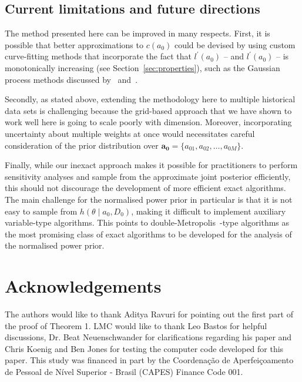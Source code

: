 \documentclass[a4paper, notitlepage, 11pt]{article}
\begin{document}
\subsection{Current limitations and future directions}
\label{sec:future}

The method presented here can be improved in many respects.
First, it is possible that better approximations  to $c(a_0)$ could be devised by using custom curve-fitting methods that incorporate the fact that  $l^\prime(a_0)$ -- and  $l^\prime(a_0)$ -- is monotonically increasing (see Section~\ref{sec:properties}), such as the Gaussian process methods discussed by~\cite{Riihimaki2010} and~\cite{Wang2016}.

Secondly, as stated above, extending the methodology here to multiple historical data sets is challenging because the grid-based approach that we have shown to work well here is going to scale poorly with dimension.
Moreover, incorporating uncertainty about multiple weights at once would necessitates careful consideration of the prior distribution over $\boldsymbol{a_0} = \{a_{01}, a_{02}, \ldots, a_{0M}\}$.

Finally, while our inexact approach makes it possible for practitioners to perform sensitivity analyses and sample from the approximate joint posterior efficiently, this should not discourage the development of more efficient exact algorithms.
The main challenge for the normalised power prior in particular is that it is not easy to sample from 
$h(\theta \mid a_0, D_0)$, making it difficult to implement auxiliary variable-type algorithms.
This points to double-Metropolis~\cite{Liang2010}-type algorithms as the most promising class of exact algorithms to be developed for the analysis of the normalised power prior.

\section*{Acknowledgements}

The authors would like to thank Aditya Ravuri for pointing out the first part of the proof of Theorem 1. 
LMC would like to thank Leo Bastos for helpful discussions, Dr. Beat Neuenschwander for clarifications regarding his paper and Chris Koenig and Ben Jones for testing the computer code developed for this paper.
This study was financed in part by the Coordenação de Aperfeiçoamento de Pessoal de Nível Superior - Brasil (CAPES) Finance Code 001.


\end{document}
